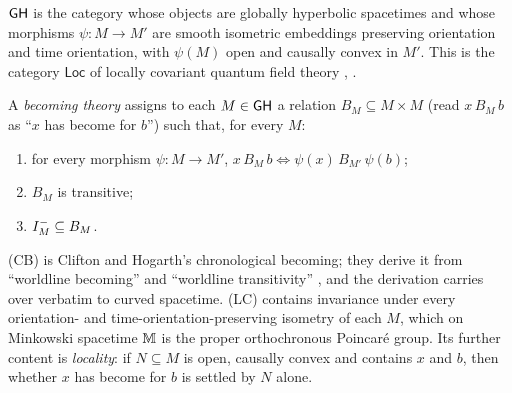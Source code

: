 \begin{definition}
$\mathsf{GH}$ is the category whose objects are globally hyperbolic spacetimes and
whose morphisms $\psi:M\to M'$ are smooth isometric embeddings preserving
orientation and time orientation, with $\psi(M)$ open and causally convex in
$M'$. This is the category $\mathsf{Loc}$ of locally covariant quantum field
theory \citep[\S2]{BFV2003}, \citep[\S2.2]{FV2012}.
\end{definition}

\begin{definition}
A \emph{becoming theory} assigns to each $M\in\mathsf{GH}$ a relation
$B_M\subseteq M\times M$ (read $x\,B_M\,b$ as ``$x$ has become for $b$'') such
that, for every $M$:
\begin{enumerate}
\item[(LC)] for every morphism $\psi:M\to M'$, $x\,B_M\,b\iff
\psi(x)\,B_{M'}\,\psi(b)$;
\item[(T)] $B_M$ is transitive;
\item[(CB)] $I^{-}_M\subseteq B_M$.
\end{enumerate}
\end{definition}

(CB) is Clifton and Hogarth's chronological becoming; they derive it from
``worldline becoming'' and ``worldline transitivity'' \citep[Lemma,
p.~364]{CH1995}, and the derivation carries over verbatim to curved
spacetime. (LC) contains invariance under every orientation- and
time-orientation-preserving isometry of each $M$, which on Minkowski spacetime
$\mathbb M$ is the proper orthochronous Poincaré group. Its further content is
\emph{locality}: if $N\subseteq M$ is open, causally convex and contains $x$
and $b$, then whether $x$ has become for $b$ is settled by $N$ alone.

